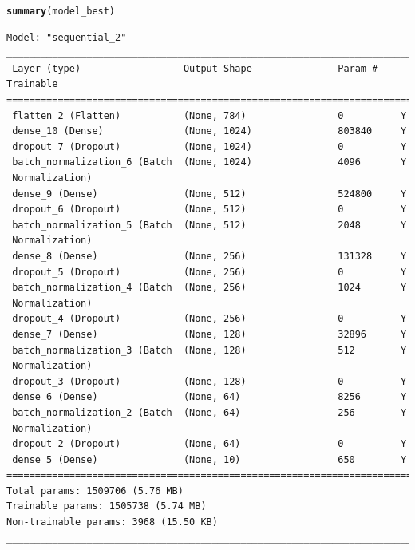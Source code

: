 \documentclass[10pt, a4paper, english]{article}\usepackage[]{graphicx}\usepackage[dvipsnames]{xcolor}
\makeatletter
\newcommand{\hlstd}[1]{\textcolor[rgb]{0.345,0.345,0.345}{#1}}%
\newcommand{\hlkwd}[1]{\textcolor[rgb]{0.737,0.353,0.396}{\textbf{#1}}}%
\newenvironment{kframe}{%
 \def\at@end@of@kframe{}%
 \ifinner\ifhmode%
  \def\at@end@of@kframe{\end{minipage}}%
  \begin{minipage}{\columnwidth}%
 \fi\fi%
 \def\FrameCommand##1{\hskip\@totalleftmargin \hskip-\fboxsep
 \colorbox{shadecolor}{##1}\hskip-\fboxsep
     \hskip-\linewidth \hskip-\@totalleftmargin \hskip\columnwidth}%
 \MakeFramed {\advance\hsize-\width
   \@totalleftmargin\z@ \linewidth\hsize
   \@setminipage}}%
 {\par\unskip\endMakeFramed%
 \at@end@of@kframe}
\newenvironment{knitrout}{}{} %
\makeatother
\begin{document}
\begin{knitrout}
\begin{kframe}
\begin{alltt}
\hlkwd{summary}\hlstd{(model_best)}
\end{alltt}
\begin{verbatim}
Model: "sequential_2"
________________________________________________________________________________
 Layer (type)                  Output Shape               Param #    Trainable  
================================================================================
 flatten_2 (Flatten)           (None, 784)                0          Y          
 dense_10 (Dense)              (None, 1024)               803840     Y          
 dropout_7 (Dropout)           (None, 1024)               0          Y          
 batch_normalization_6 (Batch  (None, 1024)               4096       Y          
 Normalization)                                                                 
 dense_9 (Dense)               (None, 512)                524800     Y          
 dropout_6 (Dropout)           (None, 512)                0          Y          
 batch_normalization_5 (Batch  (None, 512)                2048       Y          
 Normalization)                                                                 
 dense_8 (Dense)               (None, 256)                131328     Y          
 dropout_5 (Dropout)           (None, 256)                0          Y          
 batch_normalization_4 (Batch  (None, 256)                1024       Y          
 Normalization)                                                                 
 dropout_4 (Dropout)           (None, 256)                0          Y          
 dense_7 (Dense)               (None, 128)                32896      Y          
 batch_normalization_3 (Batch  (None, 128)                512        Y          
 Normalization)                                                                 
 dropout_3 (Dropout)           (None, 128)                0          Y          
 dense_6 (Dense)               (None, 64)                 8256       Y          
 batch_normalization_2 (Batch  (None, 64)                 256        Y          
 Normalization)                                                                 
 dropout_2 (Dropout)           (None, 64)                 0          Y          
 dense_5 (Dense)               (None, 10)                 650        Y          
================================================================================
Total params: 1509706 (5.76 MB)
Trainable params: 1505738 (5.74 MB)
Non-trainable params: 3968 (15.50 KB)
________________________________________________________________________________
\end{verbatim}
\end{kframe}
\end{knitrout}
\end{document}
